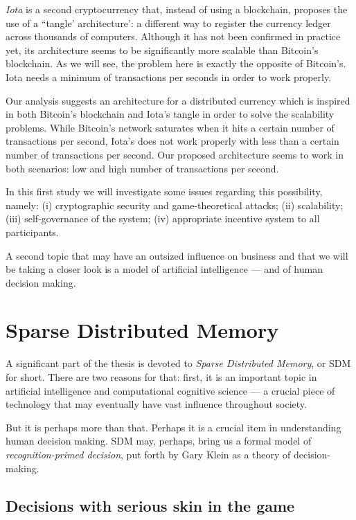 \emph{Iota} is a second cryptocurrency that, instead of using a blockchain, proposes the use of a ``tangle' architecture': a different way to register the currency ledger across thousands of computers. Although it has not been confirmed in practice yet, its architecture seems to be significantly more scalable than Bitcoin's blockchain. As we will see, the problem here is exactly the opposite of Bitcoin's. Iota needs a minimum of transactions per seconds in order to work properly.

Our analysis suggests an architecture for a distributed currency which is inspired in both Bitcoin's blockchain and Iota's tangle in order to solve the scalability problems. While Bitcoin's network saturates when it hits a certain number of transactions per second, Iota's does not work properly with less than a certain number of transactions per second. Our proposed architecture seems to work in both scenarios: low and high number of transactions per second.

In this first study we will investigate some issues regarding this possibility, namely: (i) cryptographic security and game-theoretical attacks; (ii) scalability; (iii) self-governance of the system; (iv) appropriate incentive system to all participants.

A second topic that may have an outsized influence on business and that we will be taking a closer look is a model of artificial intelligence --- and of human decision making.

\section{Sparse Distributed Memory}

A significant part of the thesis is devoted to \emph{Sparse Distributed Memory}, or SDM for short.  There are two reasons for that: first, it is an important topic in artificial intelligence and computational cognitive science --- a crucial piece of technology that may eventually have vast influence throughout society.

But it is perhaps more than that.  Perhaps it is a crucial item in understanding human decision making.  SDM may, perhaps, bring us a formal model of \emph{recognition-primed decision}, put forth by Gary Klein as a theory of decision-making.

\subsection{Decisions with serious skin in the game}

